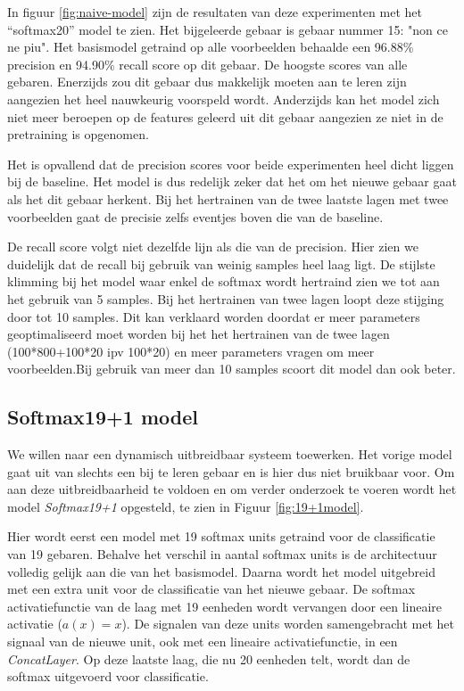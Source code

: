 \npar In figuur \ref{fig:naive-model} zijn de resultaten van deze experimenten met het ``softmax20'' model te zien. Het bijgeleerde gebaar is gebaar nummer 15: "non ce ne piu". Het basismodel getraind op alle voorbeelden behaalde een 96.88\% precision en 94.90\% recall score op dit gebaar. De hoogste scores van alle gebaren. Enerzijds zou dit gebaar dus makkelijk moeten aan te leren zijn aangezien het heel nauwkeurig voorspeld wordt. Anderzijds kan het model zich niet meer beroepen op de features geleerd uit dit gebaar aangezien ze niet in de pretraining is opgenomen.

\npar Het is opvallend dat de precision scores voor beide experimenten heel dicht liggen bij de baseline. Het model is dus redelijk zeker dat het om het nieuwe gebaar gaat als het dit gebaar herkent. Bij het hertrainen van de twee laatste lagen met twee voorbeelden gaat de precisie zelfs eventjes boven die van de baseline.

\npar De recall score volgt niet dezelfde lijn als die van de precision. Hier zien we duidelijk dat de recall bij gebruik van weinig samples heel laag ligt. De stijlste klimming bij het model waar enkel de softmax wordt hertraind zien we tot aan het gebruik van 5 samples. Bij het hertrainen van twee lagen loopt deze stijging door tot 10 samples. Dit kan verklaard worden doordat er meer parameters geoptimaliseerd moet worden bij het het hertrainen van de twee lagen (100*800+100*20 ipv 100*20) en meer parameters vragen om meer voorbeelden.Bij gebruik van meer dan 10 samples scoort dit model dan  ook beter.


\subsection{Softmax19+1 model}\label{sec:softmax19x1}
We willen naar een dynamisch uitbreidbaar systeem toewerken. Het vorige model gaat uit van slechts een bij te leren gebaar en is hier dus niet bruikbaar voor. Om aan deze uitbreidbaarheid te voldoen en om verder onderzoek te voeren wordt het model \textit{Softmax19+1} opgesteld, te zien in Figuur \ref{fig:19+1model}.


\npar Hier wordt eerst een model met 19 softmax units getraind voor de classificatie van 19 gebaren. Behalve het verschil in aantal softmax units is de architectuur volledig gelijk aan die van het basismodel. Daarna wordt het model uitgebreid met een extra unit voor de classificatie van het nieuwe gebaar. De softmax activatiefunctie van de laag met 19 eenheden wordt vervangen door een lineaire activatie ($a(x)=x$). De signalen van deze units worden samengebracht met het signaal van de nieuwe unit, ook met een lineaire activatiefunctie, in een \textit{ConcatLayer}.  Op deze laatste laag, die nu 20 eenheden telt, wordt dan de softmax uitgevoerd voor classificatie.

